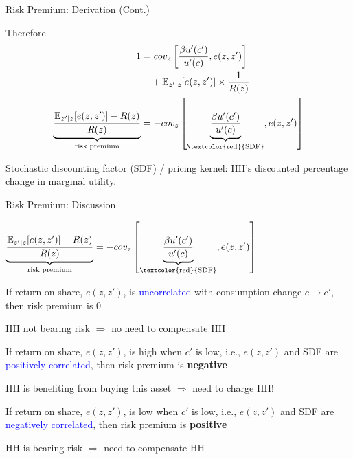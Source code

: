 \documentclass[aspectratio=169,xcolor=dvipsnames]{beamer}
\newcommand{\red}[1]{\textcolor{red}{#1}}
\newcommand{\blue}[1]{\textcolor{blue}{#1}}
\let\tempone\itemize
\let\temptwo\enditemize
\renewenvironment{itemize}{\tempone\addtolength{\itemsep}{\fill}}{\temptwo}
\let\tempa\enumerate
\let\tempb\endenumerate
\renewenvironment{enumerate}{\tempa\addtolength{\itemsep}{\fill}}{\tempb}
\begin{document}
\begin{frame}{Risk Premium: Derivation (Cont.)}
\label{slide:Risk_Premium__Derivation__Cont__}

Therefore
%
\begin{align}
    1
        & = cov_{z}\left[
        \frac{\beta u'(c')}{u'(c)}, e(z, z')
    \right]
    \\
        & \quad + \mathbb{E}_{z'|z}[e(z, z')] \times \frac{1}{R(z)}
    \\
    \underbrace{
    \frac{\mathbb{E}_{z'|z}[e(z, z')] - R(z)}{R(z)}
    }_{\text{risk premium}}
        & = -cov_{z}\left[
        \underbrace{
            \frac{\beta u'(c')}{u'(c)}
            }_{\text{\red{SDF}}}
        , e(z, z')
    \right]
    \end{align}
%

Stochastic discounting factor (SDF) / pricing kernel: HH's discounted percentage change in marginal utility.
\end{frame}

\begin{frame}{Risk Premium: Discussion}
\label{slide:Risk_Premium__Discussion}
\begin{center}
$ \displaystyle
    \underbrace{
    \frac{\mathbb{E}_{z'|z}[e(z, z')] - R(z)}{R(z)}
    }_{\text{risk premium}}
         = -cov_{z}\left[
        \underbrace{
            \frac{\beta u'(c')}{u'(c)}
            }_{\text{\red{SDF}}}
        , e(z, z')
    \right]
$
\end{center}
\begin{enumerate}
    \item If return on share, $ e(z, z') $, is \blue{uncorrelated} with consumption change $ c\rightarrow c' $, then risk premium is $ 0 $
    \begin{itemize}
        \item HH not bearing risk $ \Rightarrow  $ no need to compensate HH
    \end{itemize}
    \item If return on share, $ e(z, z') $, is high when $ c' $ is low, i.e., $ e(z, z') $ and SDF are \blue{positively correlated}, then risk premium is \textbf{negative}
    \begin{itemize}
        \item HH is benefiting from buying this asset $ \Rightarrow  $ need to charge HH!
    \end{itemize}
    \item If return on share, $ e(z, z') $, is low when $ c' $ is low, i.e., $ e(z, z') $ and SDF are \blue{negatively correlated}, then risk premium is \textbf{positive}
    \begin{itemize}
        \item HH is bearing risk $ \Rightarrow  $ need to compensate HH
    \end{itemize}

\end{enumerate}
\end{frame}
\end{document}

